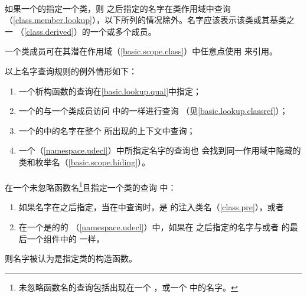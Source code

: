 \paragraph{} %
如果一个的指定一个类，则
之后指定的名字在类作用域中查询
（\ref{class.member.lookup}），以下所列的情况除外。名字应该表示该类或其基类之一
（\ref{class.derived}）的一个或多个成员。

\begin{note}
  一个类成员可在其潜在作用域（\ref{basic.scope.class}）中任意点使用
  来引用。
\end{note}

以上名字查询规则的例外情形如下：
\begin{enumerate}
  \item 一个析构函数的查询在\ref{basic.lookup.qual}中指定；
  \item 一个的与一个类成员访问
        中的一样进行查询
        （见\ref{basic.lookup.classref}）；
  \item 一个的中的名字在整个
        所出现的上下文中查询；
  \item 一个（\ref{namespace.udecl}）中所指定名字的查询也
        会找到同一作用域中隐藏的类和枚举名（\ref{basic.scope.hiding}）。
\end{enumerate}

\paragraph{} %
在一个未忽略函数名\footnote{未忽略函数名的查询包括出现在一个
，或一个
中的名字。}且指定一个类的查询
中：
\begin{enumerate}
  \item 如果名字在之后指定，当在中查询时，是
        的注入类名（\ref{class.pre}），或者
  \item 在一个是的的
        （\ref{namespace.udecl}）中，如果在
        之后指定的名字与或者
        的最后一个组件中的
        一样，
\end{enumerate}
则名字被认为是指定类的构造函数。

